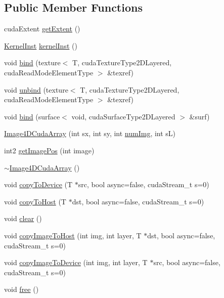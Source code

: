 \subsection*{Public Member Functions}
\begin{DoxyCompactItemize}
\item 
cuda\+Extent \hyperlink{struct_image4_d_cuda_array_a69a6e1459f05922d781b583e29fe07ca}{get\+Extent} ()
\item 
\hyperlink{struct_image4_d_cuda_array_1_1_kernel_inst}{Kernel\+Inst} \hyperlink{struct_image4_d_cuda_array_ab815a1a7c5a56396a1582845096d5ba4}{kernel\+Inst} ()
\item 
void \hyperlink{struct_image4_d_cuda_array_a335cc167d5fa7cfb2d54f02dabe49582}{bind} (texture$<$ T, cuda\+Texture\+Type2\+D\+Layered, cuda\+Read\+Mode\+Element\+Type $>$ \&texref)
\item 
void \hyperlink{struct_image4_d_cuda_array_a48bf8bb27196030387c6047cb6b7c323}{unbind} (texture$<$ T, cuda\+Texture\+Type2\+D\+Layered, cuda\+Read\+Mode\+Element\+Type $>$ \&texref)
\item 
void \hyperlink{struct_image4_d_cuda_array_a465db4fbb5e7019f3327aa1a2a5b8251}{bind} (surface$<$ void, cuda\+Surface\+Type2\+D\+Layered $>$ \&surf)
\item 
\hyperlink{struct_image4_d_cuda_array_a111e6a02aa56ecac3edb020a7628f38f}{Image4\+D\+Cuda\+Array} (int sx, int sy, int \hyperlink{struct_image4_d_cuda_array_acc1ba710635bc84af3d3032b7a38dea3}{num\+Img}, int sL)
\item 
int2 \hyperlink{struct_image4_d_cuda_array_a24b592522dd8418266cfb434cc09f40e}{get\+Image\+Pos} (int image)
\item 
\hyperlink{struct_image4_d_cuda_array_a217d7dd1db0434b6ec0e41c9b1723a89}{$\sim$\+Image4\+D\+Cuda\+Array} ()
\item 
void \hyperlink{struct_image4_d_cuda_array_a3cff003804ea5cdcc1fad578726a004b}{copy\+To\+Device} (T $\ast$src, bool async=false, cuda\+Stream\+\_\+t s=0)
\item 
void \hyperlink{struct_image4_d_cuda_array_a5f91354c4b6bffdfaea64d2feb078f81}{copy\+To\+Host} (T $\ast$dst, bool async=false, cuda\+Stream\+\_\+t s=0)
\item 
void \hyperlink{struct_image4_d_cuda_array_a7157ddd0e5a243d4692672fa0f5ac360}{clear} ()
\item 
void \hyperlink{struct_image4_d_cuda_array_ae5163e1758111d003633823d9af387f8}{copy\+Image\+To\+Host} (int img, int layer, T $\ast$dst, bool async=false, cuda\+Stream\+\_\+t s=0)
\item 
void \hyperlink{struct_image4_d_cuda_array_aed4f5c8cc5bda9d267b99757cbb23f80}{copy\+Image\+To\+Device} (int img, int layer, T $\ast$src, bool async=false, cuda\+Stream\+\_\+t s=0)
\item 
void \hyperlink{struct_image4_d_cuda_array_a57f7d708e0ecbbfd96be7ebce94200e0}{free} ()
\end{DoxyCompactItemize}

